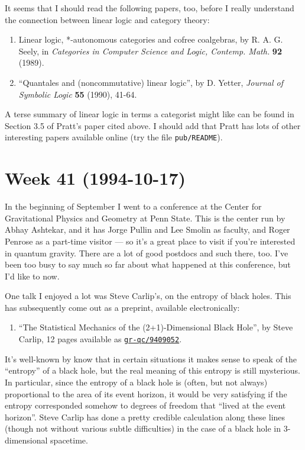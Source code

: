 \documentclass{article}
\def\tightlist{}
\begin{document}
It seems that I should read the following papers, too, before I really
understand the connection between linear logic and category theory:

\begin{enumerate}
\def\labelenumi{\arabic{enumi})}
\setcounter{enumi}{3}
\item
  Linear logic, *-autonomous categories and cofree coalgebras, by R. A.
  G. Seely, in \emph{Categories in Computer Science and Logic, Contemp.
  Math.} \textbf{92} (1989).
\item
  ``Quantales and (noncommutative) linear logic'', by D. Yetter,
  \emph{Journal of Symbolic Logic} \textbf{55} (1990), 41-64.
\end{enumerate}

A terse summary of linear logic in terms a categorist might like can be
found in Section 3.5 of Pratt's paper cited above. I should add that
Pratt has lots of other interesting papers available online (try the
file \texttt{pub/README}).
\hypertarget{week-41-1994-10-17}{%
\section{Week 41 (1994-10-17)}\label{week-41-1994-10-17}}

In the beginning of September I went to a conference at the Center for
Gravitational Physics and Geometry at Penn State. This is the center run
by Abhay Ashtekar, and it has Jorge Pullin and Lee Smolin as faculty,
and Roger Penrose as a part-time visitor --- so it's a great place to
visit if you're interested in quantum gravity. There are a lot of good
postdocs and such there, too. I've been too busy to say much so far
about what happened at this conference, but I'd like to now.

One talk I enjoyed a lot was Steve Carlip's, on the entropy of black
holes. This has subsequently come out as a preprint, available
electronically:

\begin{enumerate}
\def\labelenumi{\arabic{enumi})}
\tightlist
\item
  ``The Statistical Mechanics of the (2+1)-Dimensional Black Hole'', by
  Steve Carlip, 12 pages available as
  \href{http://xxx.lanl.gov/abs/gr-qc/9409052}{\texttt{gr-qc/9409052}}.
\end{enumerate}

It's well-known by know that in certain situations it makes sense to
speak of the ``entropy'' of a black hole, but the real meaning of this
entropy is still mysterious. In particular, since the entropy of a black
hole is (often, but not always) proportional to the area of its event
horizon, it would be very satisfying if the entropy corresponded somehow
to degrees of freedom that ``lived at the event horizon''. Steve Carlip
has done a pretty credible calculation along these lines (though not
without various subtle difficulties) in the case of a black hole in
3-dimensional spacetime.
\end{document}
